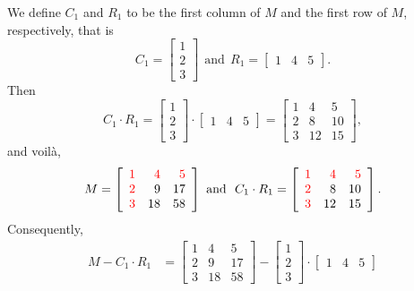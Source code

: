 \begin{example}
We define $C_1$  and $R_1$  to be the first column of $M$ and the first row of $M$, respectively, that is
$$C_1=\left[\begin{array}{r} 
    1  \\ 2 \\ 3  \end{array}  \right]~~\text{and}~~R_1=\left[\begin{array}{rrr} 
    1   &  4   &  5 \end{array}  \right].  $$
Then
$$
 C_1 \cdot R_1 =  \left[\begin{array}{r} 
    1  \\ 2 \\ 3  \end{array}  \right] \cdot \left[\begin{array}{rrr} 
    1   &  4   &  5 \end{array}  \right] = \left[\begin{array}{rrr} 
    1   &  4   &  5 \\
     2  &   8  &  10 \\
     3  &  12  &  15 \end{array}  \right],
$$
and voil\`a, 
$$M=\left[\begin{array}{rrr} 
   \color{red} 1   &   \color{red} 4   &  \color{red}  5 \\
     \color{red} 2  &   9  &  17 \\
   \color{red}   3  &  18  &  58 \end{array}  \right] \text{ and~~} C_1 \cdot R_1 = \left[\begin{array}{rrr} 
    \color{red} 1   &  \color{red} 4   &  \color{red} 5 \\
   \color{red}   2  &   8  &  10 \\
  \color{red}    3  &  12  &  15 \end{array}  \right].
$$
Consequently,
\begin{align*} 
M - C_1 \cdot R_1 &= \left[\begin{array}{rrr} 
    1   &  4   &  5 \\
     2  &   9  &  17 \\
     3  &  18  &  58 \end{array}  \right] -  \left[\begin{array}{r} 
    1  \\ 2 \\ 3  \end{array}  \right] \cdot \left[\begin{array}{rrr} 
    1   &  4   &  5 \end{array}  \right] \\

\end{align*}
\end{example}
